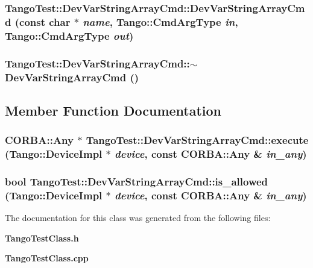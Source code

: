 \subsubsection{\setlength{\rightskip}{0pt plus 5cm}Tango\-Test::Dev\-Var\-String\-Array\-Cmd::Dev\-Var\-String\-Array\-Cmd (const char $\ast$ {\em name}, Tango::Cmd\-Arg\-Type {\em in}, Tango::Cmd\-Arg\-Type {\em out})}\label{classTangoTest_1_1DevVarStringArrayCmd_a1}


\subsubsection{\setlength{\rightskip}{0pt plus 5cm}Tango\-Test::Dev\-Var\-String\-Array\-Cmd::$\sim$Dev\-Var\-String\-Array\-Cmd ()\hspace{0.3cm}{\tt  [inline]}}\label{classTangoTest_1_1DevVarStringArrayCmd_a2}




\subsection{Member Function Documentation}
\subsubsection{\setlength{\rightskip}{0pt plus 5cm}CORBA::Any $\ast$ Tango\-Test::Dev\-Var\-String\-Array\-Cmd::execute (Tango::Device\-Impl $\ast$ {\em device}, const CORBA::Any \& {\em in\_\-any})\hspace{0.3cm}{\tt  [virtual]}}\label{classTangoTest_1_1DevVarStringArrayCmd_a4}


\subsubsection{\setlength{\rightskip}{0pt plus 5cm}bool Tango\-Test::Dev\-Var\-String\-Array\-Cmd::is\_\-allowed (Tango::Device\-Impl $\ast$ {\em device}, const CORBA::Any \& {\em in\_\-any})\hspace{0.3cm}{\tt  [virtual]}}\label{classTangoTest_1_1DevVarStringArrayCmd_a3}




The documentation for this class was generated from the following files:\begin{CompactItemize}
\item 
{\bf Tango\-Test\-Class.h}\item 
{\bf Tango\-Test\-Class.cpp}\end{CompactItemize}

